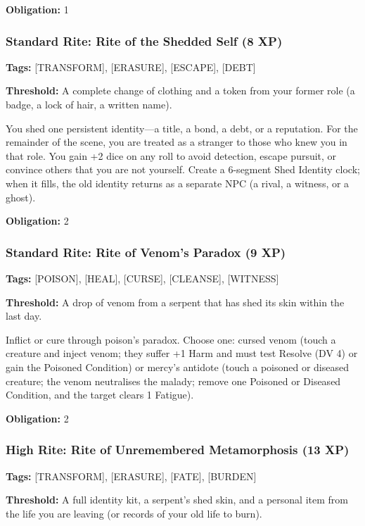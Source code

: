 \textbf{Obligation:} 1

\subsubsection{Standard Rite: Rite of the Shedded Self (8 XP)}

\textbf{Tags:} [TRANSFORM], [ERASURE], [ESCAPE], [DEBT]

\textbf{Threshold:} A complete change of clothing and a token from your former role (a badge, a lock of hair, a written name).

You shed one persistent identity—a title, a bond, a debt, or a reputation. For the remainder of the scene, you are treated as a stranger to those who knew you in that role. You gain +2 dice on any roll to avoid detection, escape pursuit, or convince others that you are not yourself. Create a 6-segment Shed Identity clock; when it fills, the old identity returns as a separate NPC (a rival, a witness, or a ghost).

\textbf{Obligation:} 2

\subsubsection{Standard Rite: Rite of Venom's Paradox (9 XP)}

\textbf{Tags:} [POISON], [HEAL], [CURSE], [CLEANSE], [WITNESS]

\textbf{Threshold:} A drop of venom from a serpent that has shed its skin within the last day.

Inflict or cure through poison's paradox. Choose one: cursed venom (touch a creature and inject venom; they suffer +1 Harm and must test Resolve (DV 4) or gain the Poisoned Condition) or mercy's antidote (touch a poisoned or diseased creature; the venom neutralises the malady; remove one Poisoned or Diseased Condition, and the target clears 1 Fatigue).

\textbf{Obligation:} 2

\subsubsection{High Rite: Rite of Unremembered Metamorphosis (13 XP)}

\textbf{Tags:} [TRANSFORM], [ERASURE], [FATE], [BURDEN]

\textbf{Threshold:} A full identity kit, a serpent's shed skin, and a personal item from the life you are leaving (or records of your old life to burn).

